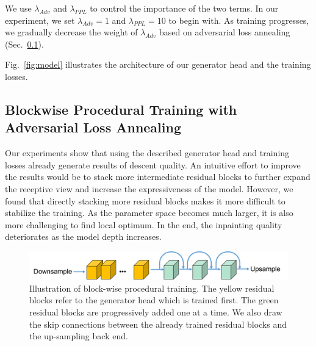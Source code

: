We use $\lambda_{Adv}$ and $\lambda_{PPL}$ to control the importance of the two terms. In our experiment, we set $\lambda_{Adv}=1$ and $\lambda_{PPL}=10$ to begin with. As training progresses, we gradually decrease the weight of $\lambda_{Adv}$ based on adversarial loss annealing (Sec.~\ref{sec:procedural}).

Fig.~\ref{fig:model} illustrates the architecture of our generator head and the training losses.

\subsection{Blockwise Procedural Training with Adversarial Loss Annealing}
\label{sec:procedural}
Our experiments show that using the described generator head and training losses already generate results of descent quality. An intuitive effort to improve the results would be to stack more intermediate residual blocks to further expand the receptive view and increase the expressiveness of the model. However, we found that directly stacking more residual blocks makes it more difficult to stabilize the training. As the parameter space becomes much larger, it is also more challenging to find local optimum. In the end, the inpainting quality deteriorates as the model depth increases.

\begin{figure}[t]
\centering
\small
\includegraphics[width=1\textwidth]{figures/proc.pdf}
\caption{Illustration of block-wise procedural training. The yellow residual blocks refer to the generator head which is trained first. The green residual blocks are progressively added one at a time. We also draw the skip connections between the already trained residual blocks and the up-sampling back end.}
\label{fig:proc}
\vspace{-20pt}
\end{figure}

